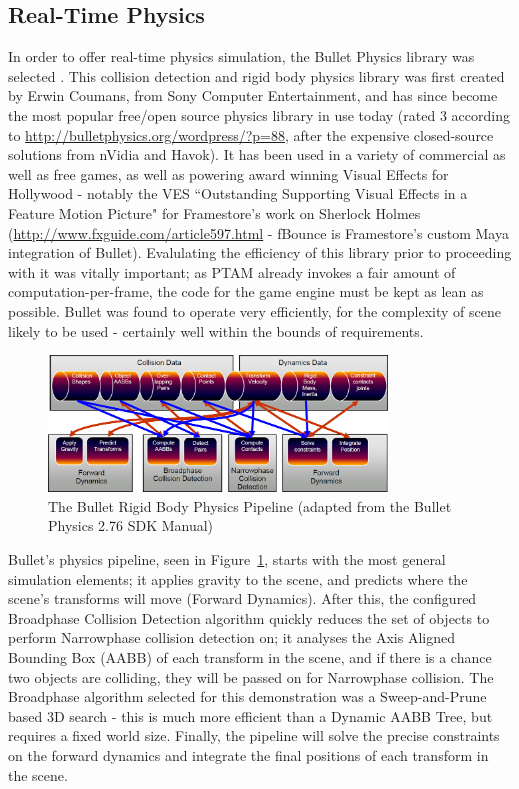 \documentclass[a4paper,10pt]{article}
\begin{document}
\subsection{Real-Time Physics}
In order to offer real-time physics simulation, the Bullet Physics library was selected \cite{bullet}. This collision detection and rigid body physics library was first created by Erwin Coumans, from Sony Computer Entertainment, and has since become the most popular free/open source physics library in use today (rated 3 according to \url{http://bulletphysics.org/wordpress/?p=88}, after the expensive closed-source solutions from nVidia and Havok). It has been used in a variety of commercial as well as free games, as well as powering award winning Visual Effects for Hollywood - notably the VES ``Outstanding Supporting Visual Effects in a Feature Motion Picture" for Framestore's work on Sherlock Holmes (\url{http://www.fxguide.com/article597.html} - fBounce is Framestore's custom Maya integration of Bullet). Evalulating the efficiency of this library prior to proceeding with it was vitally important; as PTAM already invokes a fair amount of computation-per-frame, the code for the game engine must be kept as lean as possible. Bullet was found to operate very efficiently, for the complexity of scene likely to be used - certainly well within the bounds of requirements.

\begin{figure}
  \begin{center}
    \includegraphics[width=340px]{BulletPipeline}
  \end{center}
  \caption{The Bullet Rigid Body Physics Pipeline (adapted from the Bullet Physics 2.76 SDK Manual)}
  \label{bulletpipe}
\end{figure} 

Bullet's physics pipeline, seen in Figure~\ref{bulletpipe}, starts with the most general simulation elements; it applies gravity to the scene, and predicts where the scene's transforms will move (Forward Dynamics). After this, the configured Broadphase Collision Detection algorithm quickly reduces the set of objects to perform Narrowphase collision detection on; it analyses the Axis Aligned Bounding Box (AABB) of each transform in the scene, and if there is a chance two objects are colliding, they will be passed on for Narrowphase collision. The Broadphase algorithm selected for this demonstration was a Sweep-and-Prune based 3D search - this is much more efficient than a Dynamic AABB Tree, but requires a fixed world size. Finally, the pipeline will solve the precise constraints on the forward dynamics and integrate the final positions of each transform in the scene.
\end{document}
